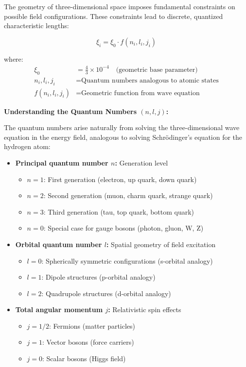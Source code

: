 \documentclass[12pt,a4paper]{article}
\begin{document}
	The geometry of three-dimensional space imposes fundamental constraints on possible field configurations. These constraints lead to discrete, quantized characteristic lengths:
	
	\begin{equation}
		\xi_i = \xi_0 \cdot f(n_i, l_i, j_i)
		\label{eq:geometric_quantization}
	\end{equation}
	
	where:
	\begin{align}
		\xi_0 &= \frac{4}{3} \times 10^{-4} \quad \text{(geometric base parameter)} \\
		n_i, l_i, j_i &= \text{Quantum numbers analogous to atomic states} \\
		f(n_i, l_i, j_i) &= \text{Geometric function from wave equation}
	\end{align}
	
	\textbf{Understanding the Quantum Numbers $(n,l,j)$:}
	
	The quantum numbers arise naturally from solving the three-dimensional wave equation in the energy field, analogous to solving Schrödinger's equation for the hydrogen atom:
	
	\begin{itemize}
		\item \textbf{Principal quantum number $n$:} Generation level
		\begin{itemize}
			\item $n=1$: First generation (electron, up quark, down quark)
			\item $n=2$: Second generation (muon, charm quark, strange quark)
			\item $n=3$: Third generation (tau, top quark, bottom quark)
			\item $n=0$: Special case for gauge bosons (photon, gluon, W, Z)
		\end{itemize}
		
		\item \textbf{Orbital quantum number $l$:} Spatial geometry of field excitation
		\begin{itemize}
			\item $l=0$: Spherically symmetric configurations (s-orbital analogy)
			\item $l=1$: Dipole structures (p-orbital analogy)
			\item $l=2$: Quadrupole structures (d-orbital analogy)
		\end{itemize}
		
		\item \textbf{Total angular momentum $j$:} Relativistic spin effects
		\begin{itemize}
			\item $j=1/2$: Fermions (matter particles)
			\item $j=1$: Vector bosons (force carriers)
			\item $j=0$: Scalar bosons (Higgs field)
		\end{itemize}
	\end{itemize}
	
\end{document}
